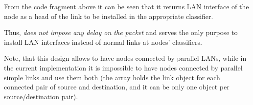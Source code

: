 From the code fragment above it can be seen that it returns LAN
interface of the node as a head of the link to be installed in the
appropriate classifier. 

Thus,  \textit{does not impose any delay on the packet}
and serves the only purpose to install LAN interfaces instead of
normal links at nodes' classifiers.  

Note, that this design allows to have nodes connected by parallel
LANs, while in the current implementation it is impossible to have
nodes connected by parallel simple links and use them both (the array
 holds the link object for each
connected pair of source and destination, and it can be only one
object per source/destination pair).

%
\endinput



